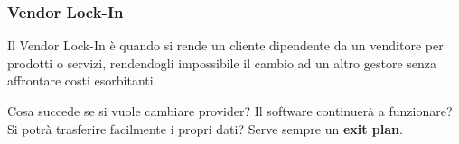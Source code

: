 \subsubsection{Vendor Lock-In}
\begin{definition}
	Il Vendor Lock-In è quando si rende un cliente dipendente da un venditore per prodotti o servizi, rendendogli impossibile il cambio ad un altro gestore senza affrontare costi esorbitanti.
\end{definition}
Cosa succede se si vuole cambiare provider? Il software continuerà a funzionare? Si potrà trasferire facilmente i propri dati? Serve sempre un \textbf{exit plan}.